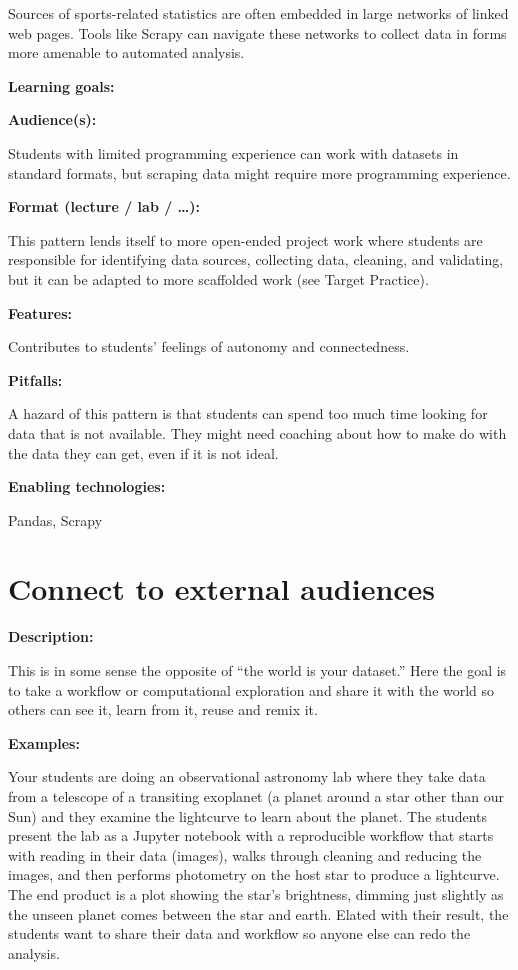 \documentclass[]{book}
\begin{document}
Sources of sports-related statistics are often embedded in large
networks of linked web pages. Tools like Scrapy can navigate these
networks to collect data in forms more amenable to automated analysis.

\textbf{Learning goals:}

\textbf{Audience(s):}

Students with limited programming experience can work with datasets in
standard formats, but scraping data might require more programming
experience.

\textbf{Format (lecture / lab / \ldots{}):}

This pattern lends itself to more open-ended project work where students
are responsible for identifying data sources, collecting data, cleaning,
and validating, but it can be adapted to more scaffolded work (see
Target Practice).

\textbf{Features:}

Contributes to students' feelings of autonomy and connectedness.

\textbf{Pitfalls:}

A hazard of this pattern is that students can spend too much time
looking for data that is not available. They might need coaching about
how to make do with the data they can get, even if it is not ideal.

\textbf{Enabling technologies:}

Pandas, Scrapy

\section{Connect to external
audiences}\label{connect-to-external-audiences}

\textbf{Description:}

This is in some sense the opposite of ``the world is your dataset.''
Here the goal is to take a workflow or computational exploration and
share it with the world so others can see it, learn from it, reuse and
remix it.

\textbf{Examples:}

Your students are doing an observational astronomy lab where they take
data from a telescope of a transiting exoplanet (a planet around a star
other than our Sun) and they examine the lightcurve to learn about the
planet. The students present the lab as a Jupyter notebook with a
reproducible workflow that starts with reading in their data (images),
walks through cleaning and reducing the images, and then performs
photometry on the host star to produce a lightcurve. The end product is
a plot showing the star's brightness, dimming just slightly as the
unseen planet comes between the star and earth. Elated with their
result, the students want to share their data and workflow so anyone
else can redo the analysis.
\end{document}
